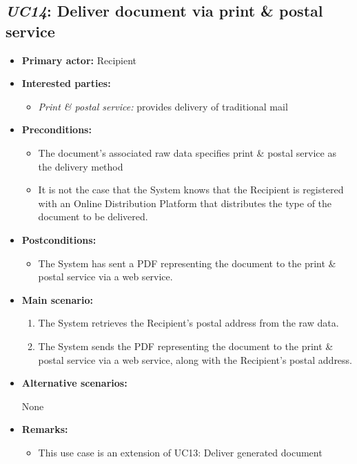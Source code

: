 \documentclass[a4paper,10pt]{article}
\begin{document}
\subsection{\emph{UC14}: Deliver document via print & postal service}
\begin{itemize}
    \item \textbf{Primary actor:} Recipient
    \item \textbf{Interested parties:} 
        \begin{itemize}
            \item \textit{Print & postal service:} provides delivery of traditional mail
        \end{itemize}

    \item \textbf{Preconditions:}
        \begin{itemize}
            \item The document's associated raw data specifies print & postal service as the delivery method
            \item It is not the case that the System knows that the Recipient is registered with an Online Distribution Platform that distributes the type of the document to be delivered.
        \end{itemize}

    \item \textbf{Postconditions:}
        \begin{itemize}
            \item The System has sent a PDF representing the document to the print & postal service via a web service.
        \end{itemize}
        
    \item \textbf{Main scenario:} 
    \begin{enumerate}
       \item The System retrieves the Recipient's postal address from the raw data.
       \item The System sends the PDF representing the document to the print & postal service via a web service, along with the Recipient's postal address.
    \end{enumerate}

    \item \textbf{Alternative scenarios:} 
    \begin{enumerate}
        None
    \end{enumerate}
    
    \item \textbf{Remarks:}
        \begin{itemize}
            \item This use case is an extension of UC13: Deliver generated document
        \end{itemize}
\end{itemize}
\end{document}

